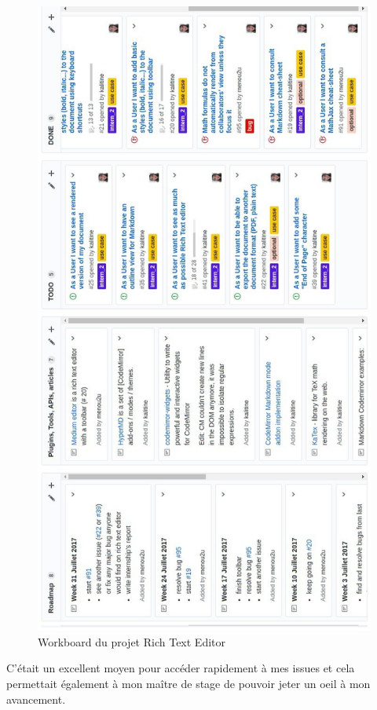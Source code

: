 \documentclass[12pt]{article}
\begin{document}
\newpage
\begin{figure}[H]
\centering
\includegraphics[scale=0.52]{gallery/workboard.jpg}
\caption[nom dans le sommaire]{Workboard du projet Rich Text Editor}
\label{fig:gallery1}
\end{figure}

\newpage
C'était un excellent moyen pour accéder rapidement à mes issues et cela permettait également à mon maître de stage de pouvoir jeter un oeil à mon avancement.\\
\end{document}
